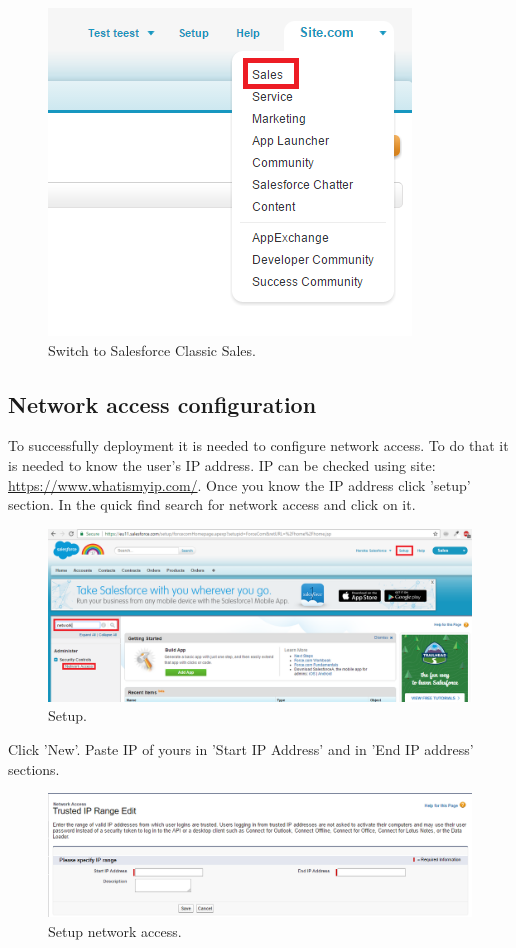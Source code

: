 \documentclass[12pt,a4paper]{article}
\begin{document}
\begin{figure}[H]
	\centering
	\includegraphics{images/change3.PNG}
	\caption{Switch to Salesforce Classic Sales.}
	\label{fig:logr}
\end{figure}
\subsection{Network access configuration}
To successfully deployment it is needed to configure network access.
To do that it is needed to know the user’s IP address. IP can be checked using site: \url{https://www.whatismyip.com/}.
Once you know the IP address click 'setup' section. In the quick find search for network access and click on it.  

\begin{figure}[H]
	\centering
	\includegraphics[width = 1 \textwidth]{images/network.PNG}
	\caption{Setup.}
	\label{fig:setup}
\end{figure}

Click 'New'. Paste IP of yours in 'Start IP Address' and in 'End IP address' sections.

\begin{figure}[H]
	\centering
	\includegraphics[width = 1 \textwidth]{images/network2.PNG}
	\caption{Setup network access.}
	\label{fig:setupp}
\end{figure}
\end{document}
